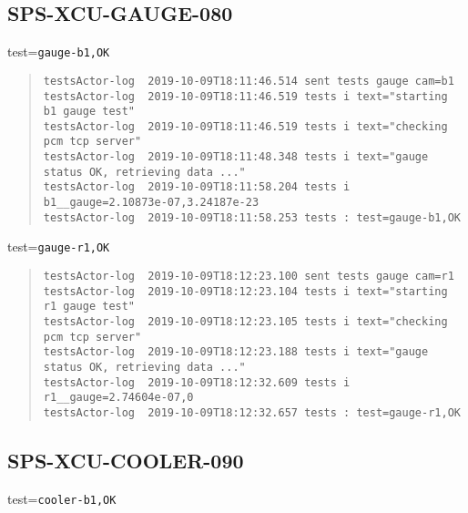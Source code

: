 \subsection{SPS-XCU-GAUGE-080}
\label{sec:tc-080}

test=\texttt{gauge-b1,OK}

\begin{quote}
\begin{tiny}
\begin{verbatim}
testsActor-log  2019-10-09T18:11:46.514 sent tests gauge cam=b1
testsActor-log  2019-10-09T18:11:46.519 tests i text="starting b1 gauge test"
testsActor-log  2019-10-09T18:11:46.519 tests i text="checking pcm tcp server"
testsActor-log  2019-10-09T18:11:48.348 tests i text="gauge status OK, retrieving data ..."
testsActor-log  2019-10-09T18:11:58.204 tests i b1__gauge=2.10873e-07,3.24187e-23
testsActor-log  2019-10-09T18:11:58.253 tests : test=gauge-b1,OK
\end{verbatim}
\end{tiny}
\end{quote}

\noindent test=\texttt{gauge-r1,OK}

\begin{quote}
\begin{tiny}
\begin{verbatim}
testsActor-log  2019-10-09T18:12:23.100 sent tests gauge cam=r1
testsActor-log  2019-10-09T18:12:23.104 tests i text="starting r1 gauge test"
testsActor-log  2019-10-09T18:12:23.105 tests i text="checking pcm tcp server"
testsActor-log  2019-10-09T18:12:23.188 tests i text="gauge status OK, retrieving data ..."
testsActor-log  2019-10-09T18:12:32.609 tests i r1__gauge=2.74604e-07,0
testsActor-log  2019-10-09T18:12:32.657 tests : test=gauge-r1,OK
\end{verbatim}
\end{tiny}
\end{quote}

\subsection{SPS-XCU-COOLER-090}
\label{sec:tc-090}

test=\texttt{cooler-b1,OK}

